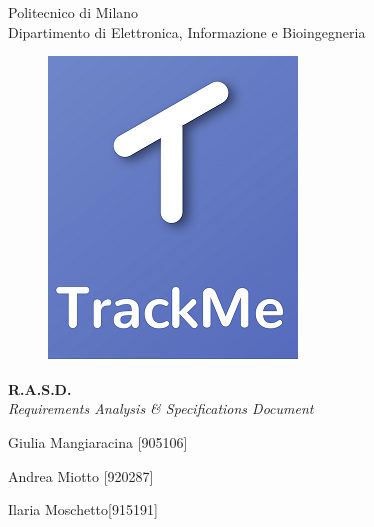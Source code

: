 \thispagestyle{empty}

\begin{center}

	\Huge Politecnico di Milano  \\   	\vspace{14pt}
    \Large Dipartimento di Elettronica, Informazione e Bioingegneria
    
    \vspace{30pt}
    
      \begin{figure}[h]
      	\centering
        \includegraphics[scale=0.5]{Pictures/Immagine.png}
      \end{figure}
    
    \vspace{30pt}
    
   
    \huge \textbf{R.A.S.D.} \\
    \vspace{7pt}
    \Large \emph{Requirements Analysis \& Specifications Document} \\
    
    \vspace{120pt}
    
    \large Giulia Mangiaracina [905106]\\
    
    \vspace{5pt}
    
    \large Andrea Miotto [920287]\\
    
    \vspace{5pt}
    
    \large Ilaria Moschetto[915191]
    
    
\end{center}